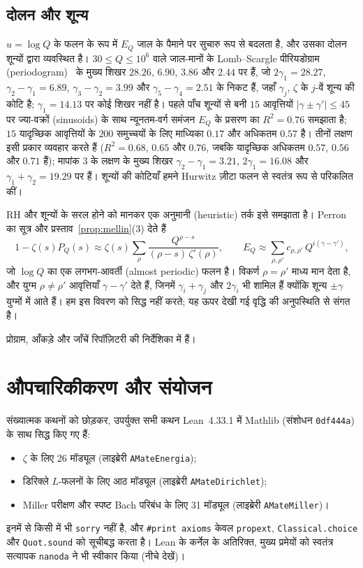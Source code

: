 \documentclass[11pt,a4paper]{amsart}
\theoremstyle{definition}
\theoremstyle{remark}
\begin{document}
\subsection*{दोलन और शून्य}
$u=\log Q$ के फलन के रूप में $E_Q$ जाल के पैमाने पर सुचारु रूप से बदलता है, और उसका दोलन शून्यों द्वारा व्यवस्थित है। $30\le Q\le10^6$ वाले जाल-मानों के Lomb--Scargle पीरियडोग्राम (periodogram)~\cite{Lomb,Scargle} के मुख्य शिखर $28.26$, $6.90$, $3.86$ और $2.44$ पर हैं, जो $2\gamma_1=28.27$, $\gamma_2-\gamma_1=6.89$, $\gamma_3-\gamma_2=3.99$ और $\gamma_5-\gamma_4=2.51$ के निकट हैं, जहाँ $\gamma_j$, $\zeta$ के $j$-वें शून्य की कोटि है; $\gamma_1=14.13$ पर कोई शिखर नहीं है। पहले पाँच शून्यों से बनी $15$ आवृत्तियों $|\gamma\pm\gamma'|\le45$ पर ज्या-वक्रों (sinusoids) के साथ न्यूनतम-वर्ग समंजन $E_Q$ के प्रसरण का $R^2=0.76$ समझाता है; $15$ यादृच्छिक आवृत्तियों के $200$ समुच्चयों के लिए माध्यिका $0.17$ और अधिकतम $0.57$ है। तीनों लक्षण इसी प्रकार व्यवहार करते हैं ($R^2=0.68$, $0.65$ और $0.76$, जबकि यादृच्छिक अधिकतम $0.57$, $0.56$ और $0.71$ हैं); मापांक $3$ के लक्षण के मुख्य शिखर $\gamma_2-\gamma_1=3.21$, $2\gamma_1=16.08$ और $\gamma_1+\gamma_2=19.29$ पर हैं। शून्यों की कोटियाँ हमने Hurwitz ज़ीटा फलन से स्वतंत्र रूप से परिकलित कीं।

RH और शून्यों के सरल होने को मानकर एक अनुमानी (heuristic) तर्क इसे समझाता है। Perron का सूत्र और प्रस्ताव~\ref{prop:mellin}(3) देते हैं
\[
1-\zeta(s)P_Q(s)\approx\zeta(s)\sum_\rho\frac{Q^{\rho-s}}{(\rho-s)\,\zeta'(\rho)},\qquad
E_Q\approx\sum_{\rho,\rho'}c_{\rho,\rho'}\,Q^{i(\gamma-\gamma')},
\]
जो $\log Q$ का एक लगभग-आवर्ती (almost periodic) फलन है। विकर्ण $\rho=\rho'$ माध्य मान देता है, और युग्म $\rho\ne\rho'$ आवृत्तियाँ $\gamma-\gamma'$ देते हैं, जिनमें $\gamma_i+\gamma_j$ और $2\gamma_i$ भी शामिल हैं क्योंकि शून्य $\pm\gamma$ युग्मों में आते हैं। हम इस विवरण को सिद्ध नहीं करते; यह ऊपर देखी गई वृद्धि की अनुपस्थिति से संगत है।

प्रोग्राम, आँकड़े और जाँचें रिपॉज़िटरी की निर्देशिका  में हैं।

\section{औपचारिकीकरण और संयोजन}\label{sec:formal}

संख्यात्मक कथनों को छोड़कर, उपर्युक्त सभी कथन Lean~4.33.1 में Mathlib (संशोधन \texttt{0df444a}) के साथ सिद्ध किए गए हैं:
\begin{itemize}
\item $\zeta$ के लिए 26 मॉड्यूल (लाइब्रेरी \texttt{AMateEnergia});
\item डिरिक्ले $L$-फलनों के लिए आठ मॉड्यूल (लाइब्रेरी \texttt{AMateDirichlet});
\item Miller परीक्षण और स्पष्ट Bach परिबंध के लिए 31 मॉड्यूल (लाइब्रेरी \texttt{AMateMiller})।
\end{itemize}
इनमें से किसी में भी \texttt{sorry} नहीं है, और \texttt{\#print axioms} केवल \texttt{propext}, \texttt{Classical.choice} और \texttt{Quot.sound} को सूचीबद्ध करता है। Lean के कर्नेल के अतिरिक्त, मुख्य प्रमेयों को स्वतंत्र सत्यापक \texttt{nanoda} ने भी स्वीकार किया (नीचे देखें)।
\end{document}
